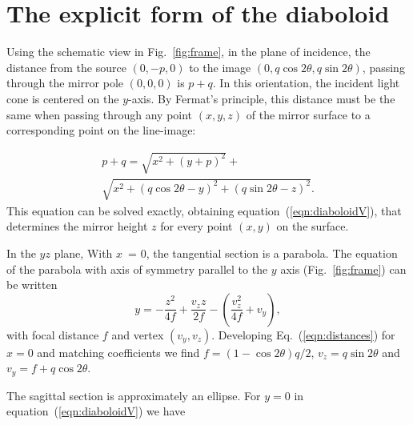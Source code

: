 \documentclass{iucr}       %
\begin{document}
\appendix

\section{The explicit form of the diaboloid }
\label{appendix:diaboloid}

Using the schematic view in Fig.~\ref{fig:frame}, in the plane of incidence, the distance from the source $(0,-p,0)$ to the image $(0,q \cos2\theta, q \sin2\theta)$, passing through the mirror pole $(0,0,0)$ is $p+q$. In this orientation, the incident light cone is centered on the $y$-axis. By Fermat's principle, this distance must be the same when passing through any point $(x,y,z)$ of the mirror surface to a corresponding point on the line-image:

\begin{multline}
\label{eqn:distances}
p + q = 
\sqrt{x^2 + (y + p)^2} + \\
\sqrt{x^2 + (q \cos2 \theta - y)^2 + (q \sin2 \theta - z)^2}.
\end{multline}
This equation can be solved exactly, obtaining equation~(\ref{eqn:diaboloidV}), that determines the mirror height $z$ for every point $(x,y)$ on the surface.

In the $yz$ plane, With $x$~= 0, the tangential section is a parabola. The equation of the parabola with axis of symmetry parallel to the $y$ axis (Fig.~\ref{fig:frame}) can be written 
\begin{equation}
y = -\frac{z^2}{4 f} + \frac{v_z z}{2 f} - \left(\frac{v_z^2}{4 f} + v_y\right),
\end{equation}
\noindent with focal distance $f$ and vertex $(v_y,v_z)$. Developing Eq.~(\ref{eqn:distances}) for $x=0$ and matching coefficients we find $f=(1-\cos2\theta)q/2$, $v_z=q \sin2\theta$ and $v_y=f+q\cos2\theta$.

The sagittal section is approximately an ellipse. For $y=0$ in equation~(\ref{eqn:diaboloidV}) we have
\end{document}

